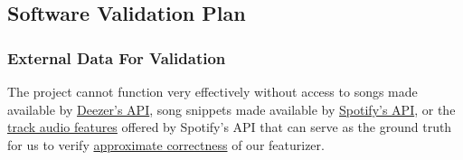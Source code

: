 \documentclass[12pt, titlepage]{article}
\begin{document}
\subsection{Software Validation Plan}






\subsubsection{External Data For Validation}
The project cannot function very effectively without access to songs made available by \href{https://developers.deezer.com/api}{Deezer's API}, song snippets made available by \href{https://developer.spotify.com/documentation/web-api}{Spotify's API}, or the \href{https://developer.spotify.com/documentation/web-api/reference/get-several-audio-features}{track audio features} offered by Spotify's API that can serve as the ground truth for us to verify \href{https://en.wikipedia.org/wiki/Probably_approximately_correct_learning#:~:text=In%20this%20framework,the%20samples.}{approximate correctness} of our featurizer.
\end{document}
